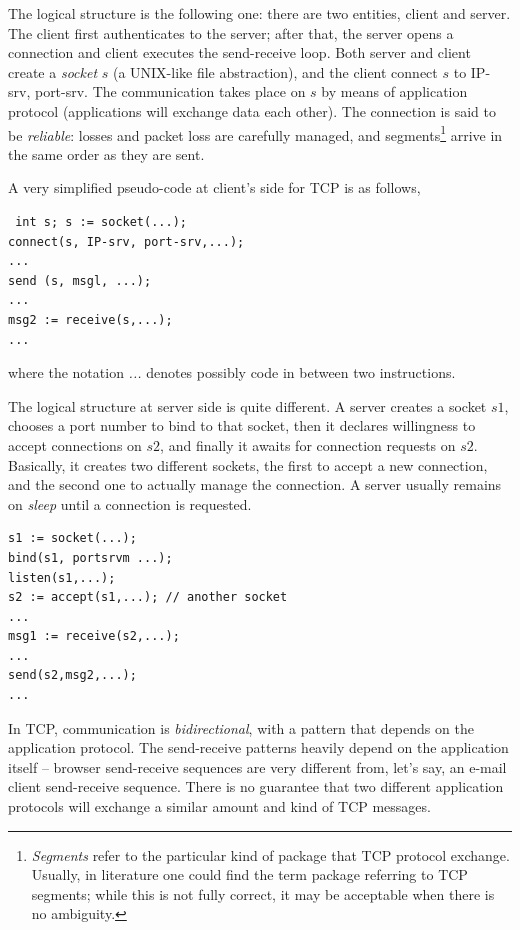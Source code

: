 \documentclass[a4paper, 11pt]{report}
\begin{document}
The logical structure is the following one: there are two entities, client and
server. The client first authenticates to the server; after that, the server
opens a connection and client executes the send-receive loop. Both server and
client create a \emph{socket} $s$ (a UNIX-like file abstraction), and the
client connect $s$ to IP-srv, port-srv. The communication takes place on $s$ by
means of application protocol (applications will exchange data each other). The
connection is said to be \emph{reliable}: losses and packet loss are carefully
managed, and segments\footnote{\emph{Segments} refer to the particular kind of
package that TCP protocol exchange. Usually, in literature one could find the
term package referring to TCP segments; while this is not fully correct, it may
be acceptable when there is no ambiguity.} arrive in the same order as they are
sent.

A very simplified pseudo-code at client's side for TCP is as follows,

\begin{verbatim} int s; s := socket(...); 
connect(s, IP-srv, port-srv,...); 
...
send (s, msgl, ...); 
... 
msg2 := receive(s,...); 
... 
\end{verbatim}

where the notation \emph{...} denotes possibly code in between two
instructions.

The logical structure at server side is quite different. A server creates
a socket $s1$, chooses a port number to bind to that socket, then it declares
willingness to accept connections on $s2$, and finally it awaits for connection
requests on $s2$. Basically, it creates two different sockets, the first to
accept a new connection, and the second one to actually manage the connection.
A server usually remains on \emph{sleep} until a connection is requested.

\begin{verbatim} 
s1 := socket(...);
bind(s1, portsrvm ...);
listen(s1,...);
s2 := accept(s1,...); // another socket 
... 
msg1 := receive(s2,...);
...
send(s2,msg2,...);
... 
\end{verbatim}

In TCP, communication is \emph{bidirectional}, with a pattern that depends on
the application protocol. The send-receive patterns heavily depend on the
application itself \--- browser send-receive sequences are very different from,
let's say, an e-mail client send-receive sequence. There is no guarantee that
two different application protocols will exchange a similar amount and kind of
TCP messages.
\end{document}
